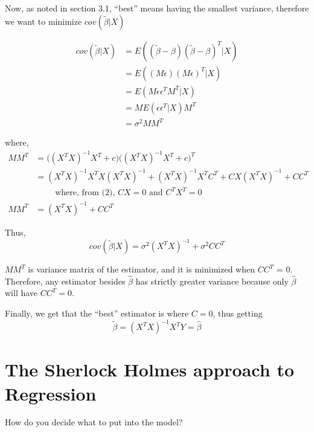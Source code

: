 \documentclass[12pt]{article}
\begin{document}
Now, as noted in section 3.1, ``best'' means having the smallest variance, therefore we want to minimize $cov(\tilde{\beta} | X)$

\doublespacing
\[ \begin{array}{rl}
cov(\tilde{\beta} | X) &= E((\tilde{\beta} - \beta)(\tilde{\beta} - \beta)^{T} | X) \\
&= E((M\epsilon)(M\epsilon)^{T} |X) \\
&= E(M\epsilon \epsilon^{T} M^{T} |X) \\
&= M E(\epsilon \epsilon^{T} | X) M^{T} \\
&= \sigma^2MM^{T}
\end{array} \]
\singlespacing

where,
\doublespacing
\[ \begin{array}{rl}
MM^{T}  &= \big((X^{T}X)^{-1}X^{T} + c\big)\big((X^{T}X)^{-1}X^{T} + c\big)^{T} \\
&= (X^{T}X)^{-1}X^{T}X(X^{T}X)^{-1} + (X^{T}X)^{-1}X^{T}C^{T} + CX(X^{T}X)^{-1} + CC^{T} \\
& \qquad \text{ where, from (2), } CX = 0 \text{ and } C^{T}X^{T} = 0 \\
MM^{T} &= (X^{T}X)^{-1} + CC^{T}
\end{array} \]
\singlespacing

Thus,
\[ cov(\tilde{\beta} | X) = \sigma^2(X^{T}X)^{-1} + \sigma^2CC^{T} \]

$MM^{T}$ is variance matrix of the estimator, and it is minimized when $CC^{T}$ = 0.  Therefore, any estimator besides $\hat{\beta}$ has strictly greater variance because only $\hat{\beta}$ will have $CC^{T} = 0$.

Finally, we get that the ``best'' estimator is where $C = 0$, thus getting
\[ \tilde{\beta} = (X^{T}X)^{-1}X^{T}Y = \hat{\beta} \]

\section{The Sherlock Holmes approach to Regression}

How do you decide what to put into the model?
\end{document}
